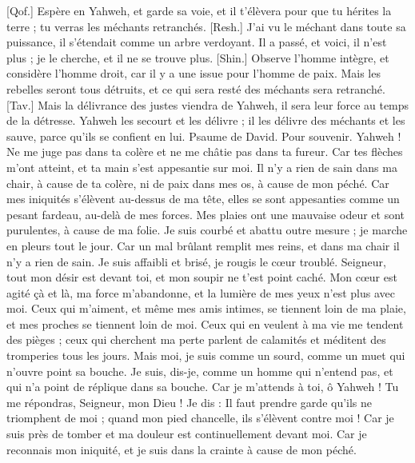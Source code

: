 \begin{multicols}{2}
[Qof.] Espère en Yahweh, et garde sa voie, et il t'élèvera pour que tu hérites la terre ; tu verras les méchants retranchés.
[Resh.] J'ai vu le méchant dans toute sa puissance, il s'étendait comme un arbre verdoyant.
Il a passé, et voici, il n'est plus ; je le cherche, et il ne se trouve plus.
[Shin.] Observe l'homme intègre, et considère l'homme droit, car il y a une issue pour l'homme de paix.
Mais les rebelles seront tous détruits, et ce qui sera resté des méchants sera retranché.
[Tav.] Mais la délivrance des justes viendra de Yahweh, il sera leur force au temps de la détresse.
Yahweh les secourt et les délivre ; il les délivre des méchants et les sauve, parce qu'ils se confient en lui.
\VerseOne{}Psaume de David. Pour souvenir.
Yahweh ! Ne me juge pas dans ta colère et ne me châtie pas dans ta fureur.
Car tes flèches m'ont atteint, et ta main s'est appesantie sur moi.
Il n'y a rien de sain dans ma chair, à cause de ta colère, ni de paix dans mes os, à cause de mon péché.
Car mes iniquités s'élèvent au-dessus de ma tête, elles se sont appesanties comme un pesant fardeau, au-delà de mes forces.
Mes plaies ont une mauvaise odeur et sont purulentes, à cause de ma folie.
Je suis courbé et abattu outre mesure ; je marche en pleurs tout le jour.
Car un mal brûlant remplit mes reins, et dans ma chair il n'y a rien de sain.
Je suis affaibli et brisé, je rougis le cœur troublé.
Seigneur, tout mon désir est devant toi, et mon soupir ne t'est point caché.
Mon cœur est agité çà et là, ma force m'abandonne, et la lumière de mes yeux n'est plus avec moi.
Ceux qui m'aiment, et même mes amis intimes, se tiennent loin de ma plaie, et mes proches se tiennent loin de moi.
Ceux qui en veulent à ma vie me tendent des pièges ; ceux qui cherchent ma perte parlent de calamités et méditent des tromperies tous les jours.
Mais moi, je suis comme un sourd, comme un muet qui n'ouvre point sa bouche.
Je suis, dis-je, comme un homme qui n'entend pas, et qui n'a point de réplique dans sa bouche.
Car je m'attends à toi, ô Yahweh ! Tu me répondras, Seigneur, mon Dieu !
Je dis : Il faut prendre garde qu'ils ne triomphent de moi ; quand mon pied chancelle, ils s'élèvent contre moi !
Car je suis près de tomber et ma douleur est continuellement devant moi.
Car je reconnais mon iniquité, et je suis dans la crainte à cause de mon péché.

\end{multicols}
